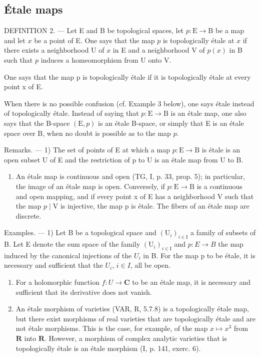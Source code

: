\subsection{Étale maps}

DEFINITION 2. --- Let E and B be topological spaces, let \(p\colon\mathrm{E}\to\mathrm{B}\) be a map and let \(x\) be a point of E. One says that the map \(p\) is topologically étale at \(x\) if there exists a neighborhood U of \(x\) in E and a neighborhood V of \(p(x)\) in B such that \(p\) induces a homeomorphism from U onto V.

One says that the map p is topologically étale if it is topologically étale at every point x of E.

When there is no possible confusion (cf. Example 3 below), one says étale instead of topologically étale. Instead of saying that \(p\colon \mathrm{E}\to \mathrm{B}\) is an étale map, one also says that the B-space \((\mathrm{E},p)\) is an étale B-space, or simply that E is an étale space over B, when no doubt is possible as to the map \(p\).

Remarks. --- 1) The set of points of E at which a map \(p \colon \mathrm{E} \to \mathrm{B}\) is étale is an open subset U of E and the restriction of p to U is an étale map from U to B.

\begin{enumerate}
\def\labelenumi{\arabic{enumi})}
\setcounter{enumi}{1}
\tightlist
\item
  An étale map is continuous and open (TG, I, p. 33, prop. 5); in particular, the image of an étale map is open. Conversely, if \(p \colon \mathrm{E} \to \mathrm{B}\) is a continuous and open mapping, and if every point x of E has a neighborhood V such that the map \(p \mid \mathrm{V}\) is injective, the map p is étale. The fibers of an étale map are discrete.
\end{enumerate}

Examples. --- 1) Let B be a topological space and \((\mathrm{U}_{i})_{i\in\mathrm{I}}\) a family of subsets of B. Let E denote the sum space of the family \((\mathrm{U}_{i})_{i\in\mathrm{I}}\) and \(p: E \to B\) the map induced by the canonical injections of the \(U_{i}\) in B. For the map p to be étale, it is necessary and sufficient that the \(U_{i}\), \(i \in I\), all be open.

\begin{enumerate}
\def\labelenumi{\arabic{enumi})}
\setcounter{enumi}{1}
\item
For a holomorphic function \(f\colon U \to \mathbf{C}\) to be an étale map, it is necessary and sufficient that its derivative does not vanish.
\item
  An étale morphism of varieties (VAR, R, 5.7.8) is a topologically étale map, but there exist morphisms of real varieties that are topologically étale and are not étale morphisms. This is the case, for example, of the map \(x \mapsto x^3\) from \(\mathbf{R}\) into \(\mathbf{R}\). However, a morphism of complex analytic varieties that is topologically étale is an étale morphism (I, p. 141, exerc. 6).
\end{enumerate}

